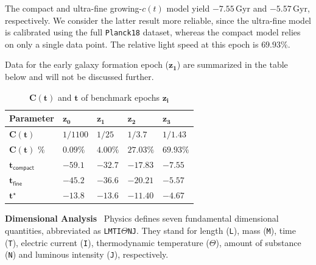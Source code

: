 \documentclass[12pt,leqno]{article}
\begin{document}
	\medskip
	The compact and ultra-fine growing-$c(t)$ model yield $-7.55\,\mathrm{Gyr}$ and $-5.57\,\mathrm{Gyr}$, respectively. We consider the latter result more reliable, since the ultra-fine model is calibrated using the full \texttt{Planck18} dataset, whereas the compact model relies on only a single data point. The relative light speed at this epoch is $69.93\%$. 
	
	\medskip
	Data for the early galaxy formation epoch ($\boldsymbol{z_1}$) are summarized in the table below and will not be discussed further.
	
	\bigskip
	\begin{table}[H]
		\centering
		\captionsetup{skip=2pt, font=small}
		\caption{$\boldsymbol{C(t)}$ and $\boldsymbol{t}$ of benchmark epochs $\boldsymbol{z_i}$}
		\footnotesize
		\renewcommand{\arraystretch}{1.50}
		\begin{tabular}{>{\centering\arraybackslash}p{2.5cm}|>{\centering\arraybackslash}p{2cm}>{\centering\arraybackslash}p{2cm}|>{\centering\arraybackslash}p{2cm}>{\centering\arraybackslash}p{2cm}}
			\toprule
			\textbf{Parameter} & \textbf{$\boldsymbol{z_0}$} & \textbf{$\boldsymbol{z_1}$} & \textbf{$\boldsymbol{z_2}$} & \textbf{$\boldsymbol{z_3}$} \\
			\midrule
			$\boldsymbol{C(t)}$                     & $1/1100$    & $1/25$    & $1/3.7$   & $1/1.43$   \\
			$\boldsymbol{C(t)\,\,\%}$               & $0.09\%$    & $4.00\%$  & $27.03\%$ & $69.93\%$  \\
			$\boldsymbol{t}\mathsf{_{compact}}$     & $-59.1$     & $-32.7$   & $-17.83$  & $-7.55$    \\
			$\boldsymbol{t}\mathsf{_{fine}}$        & $-45.2$     & $-36.6$   & $-20.21$  & $-5.57$    \\
			$\boldsymbol{t^\star}$                  & $-13.8$     & $-13.6$   & $-11.40$  & $-4.67$    \\
			\bottomrule
		\end{tabular}
	\end{table}
	
	
	
	\medskip
	{\bf Dimensional Analysis}\,\,\,
	Physics defines seven fundamental dimensional quantities, abbreviated as \texttt{LMTI$\Theta$NJ}. They stand for length (\texttt{L}), mass (\texttt{M}), time (\texttt{T}), electric current (\texttt{I}), thermodynamic temperature (\texttt{$\Theta$}), amount of substance (\texttt{N}) and luminous intensity (\texttt{J}), respectively.
	
\end{document}
